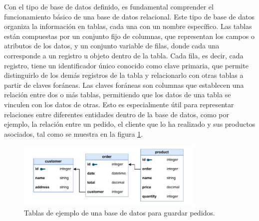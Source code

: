 Con el tipo de base de datos definido, es fundamental comprender el funcionamiento básico de una base de datos relacional. Este tipo de base de datos organiza la información en tablas, cada una con un nombre específico. Las tablas están compuestas por un conjunto fijo de columnas, que representan los campos o atributos de los datos, y un conjunto variable de filas, donde cada una corresponde a un registro u objeto dentro de la tabla. Cada fila, es decir, cada registro, tiene un identificador único conocido como clave primaria, que permite distinguirlo de los demás registros de la tabla y relacionarlo con otras tablas a partir de claves foráneas. Las claves foráneas son columnas que establecen una relación entre dos o más tablas, permitiendo que los datos de una tabla se vinculen con los datos de otras. Esto es especialmente útil para representar relaciones entre diferentes entidades dentro de la base de datos, como por ejemplo, la relación entre un pedido, el cliente que lo ha realizado y sus productos asociados, tal como se muestra en la figura \ref{fig:rel_db}.

\begin{figure}
    \centering
    \includegraphics[width=0.8\textwidth]{figures/theoric_frame/rel_db.pdf}
    \caption{Tablas de ejemplo de una base de datos para guardar pedidos.}
    \label{fig:rel_db}
\end{figure}

